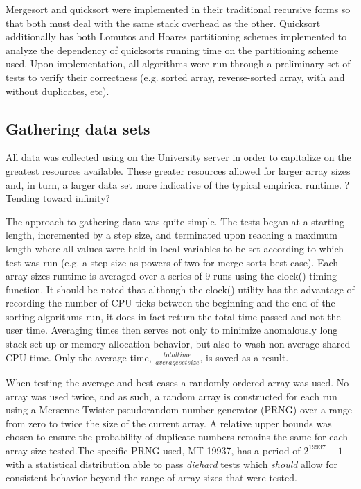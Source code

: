 \documentclass[11pt,letterpaper]{report}
\begin{document}
Mergesort and quicksort were implemented in their traditional recursive forms so that both must deal with the same stack overhead as the other. Quicksort additionally has both Lomutos and Hoares partitioning schemes implemented to analyze the dependency of quicksorts running time on the partitioning scheme used. Upon implementation, all algorithms were run through a preliminary set of tests to verify their correctness (e.g. sorted array, reverse-sorted array, with and without duplicates, etc).

\subsection*{Gathering data sets}
All data was collected using on the University server in order to capitalize on the greatest resources available. These greater resources allowed for larger array sizes and, in turn, a larger data set more indicative of the typical empirical runtime. ? Tending toward infinity?

The approach to gathering data was quite simple. The tests began at a starting length, incremented by a step size, and terminated upon reaching a maximum length where all values were held in local variables to be set according to which test was run (e.g. a step size as powers of two for merge sorts best case). Each array sizes runtime is averaged over a series of 9 runs using the clock() timing function. It should be noted that although the clock() utility has the advantage of recording the number of CPU ticks between the beginning and the end of the sorting algorithms run, it does in fact return the total time passed and not the user time. Averaging times then serves not only to minimize anomalously long stack set up or memory allocation behavior, but also to wash non-average shared CPU time. Only the average time, $\frac{total time}{average set size}$, is saved as a result. 

When testing the average and best cases a randomly ordered array was used. No array was used twice, and as such, a random array is constructed for each run using a Mersenne Twister pseudorandom number generator (PRNG) over a range from zero to twice the size of the current array. A relative upper bounds was chosen to ensure the probability of duplicate numbers remains the same for each array size tested.The specific PRNG used, MT-19937, has a period of $2^{19937}-1$ with a statistical distribution able to pass \emph{diehard} tests which \emph{should} allow for consistent behavior beyond the range of array sizes that were tested.
\end{document}
